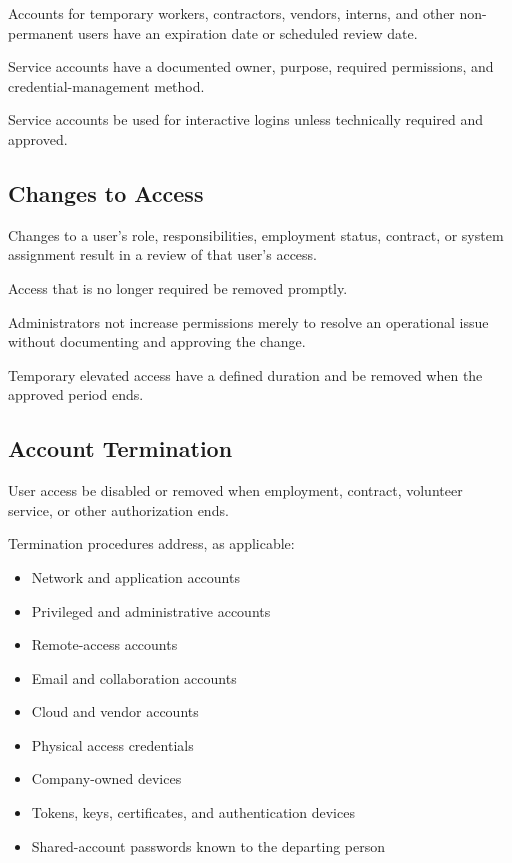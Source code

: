 Accounts for temporary workers, contractors, vendors, interns, and other non-permanent users \must{} have an expiration date or scheduled review date.

Service accounts \must{} have a documented owner, purpose, required permissions, and credential-management method.

Service accounts \mustnot{} be used for interactive logins unless technically required and approved.

\subsection{Changes to Access}

Changes to a user's role, responsibilities, employment status, contract, or system assignment \must{} result in a review of that user's access.

Access that is no longer required \must{} be removed promptly.

Administrators \must{} not increase permissions merely to resolve an operational issue without documenting and approving the change.

Temporary elevated access \must{} have a defined duration and \must{} be removed when the approved period ends.

\subsection{Account Termination}

User access \must{} be disabled or removed when employment, contract, volunteer service, or other authorization ends.

Termination procedures \must{} address, as applicable:
\begin{itemize}
    \item Network and application accounts
    \item Privileged and administrative accounts
    \item Remote-access accounts
    \item Email and collaboration accounts
    \item Cloud and vendor accounts
    \item Physical access credentials
    \item Company-owned devices
    \item Tokens, keys, certificates, and authentication devices
    \item Shared-account passwords known to the departing person
\end{itemize}

